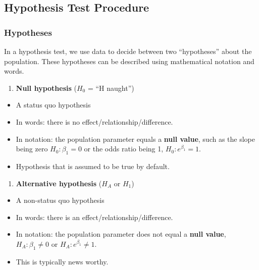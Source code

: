 \documentclass[
]{book}
\providecommand{\tightlist}{%
  \setlength{\itemsep}{0pt}\setlength{\parskip}{0pt}}
\begin{document}
\hypertarget{hypothesis-test-procedure}{%
\subsection{Hypothesis Test Procedure}\label{hypothesis-test-procedure}}

\hypertarget{hypotheses}{%
\subsubsection{Hypotheses}\label{hypotheses}}

In a hypothesis test, we use data to decide between two ``hypotheses'' about the population. These hypotheses can be described using mathematical notation and words.

\begin{enumerate}
\def\labelenumi{\arabic{enumi}.}
\tightlist
\item
  \textbf{Null hypothesis} (\(H_0\) = ``H naught'')\\
\end{enumerate}

\begin{itemize}
\tightlist
\item
  A status quo hypothesis
\item
  In words: there is no effect/relationship/difference.
\item
  In notation: the population parameter equals a \textbf{null value}, such as the slope being zero \(H_0: \beta_1 = 0\) or the odds ratio being 1, \(H_0: e^{\beta_1} = 1\).
\item
  Hypothesis that is assumed to be true by default.
\end{itemize}

\begin{enumerate}
\def\labelenumi{\arabic{enumi}.}
\setcounter{enumi}{1}
\tightlist
\item
  \textbf{Alternative hypothesis} (\(H_A\) or \(H_1\))\\
\end{enumerate}

\begin{itemize}
\tightlist
\item
  A non-status quo hypothesis
\item
  In words: there is an effect/relationship/difference.
\item
  In notation: the population parameter does not equal a \textbf{null value}, \(H_A: \beta_1 \neq 0\) or \(H_A: e^{\beta_1} \neq 1\).
\item
  This is typically news worthy.
\end{itemize}
\end{document}
